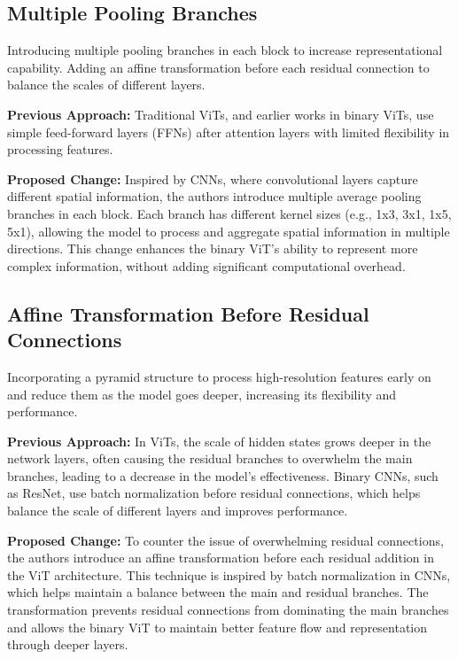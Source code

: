 \documentclass{report}
\begin{document}
	
	\subsection{Multiple Pooling Branches}
	Introducing multiple pooling branches in each block to increase representational capability.
	Adding an affine transformation before each residual connection to balance the scales of different layers.
	
	\textbf{Previous Approach:} Traditional ViTs, and earlier works in binary ViTs, use simple feed-forward layers (FFNs) after attention layers with limited flexibility in processing features.
	
	
	\textbf{Proposed Change:} Inspired by CNNs, where convolutional layers capture different spatial information, the authors introduce multiple average pooling branches in each block. Each branch has different kernel sizes (e.g., 1x3, 3x1, 1x5, 5x1), allowing the model to process and aggregate spatial information in multiple directions. This change enhances the binary ViT’s ability to represent more complex information, without adding significant computational overhead.
	
	
	
	\subsection{Affine Transformation Before Residual Connections}
	Incorporating a pyramid structure to process high-resolution features early on and reduce them as the model goes deeper, increasing its flexibility and performance.
	
	
	\textbf{Previous Approach:} In ViTs, the scale of hidden states grows deeper in the network layers, often causing the residual branches to overwhelm the main branches, leading to a decrease in the model’s effectiveness. Binary CNNs, such as ResNet, use batch normalization before residual connections, which helps balance the scale of different layers and improves performance.
	
	
	\textbf{Proposed Change:} To counter the issue of overwhelming residual connections, the authors introduce an affine transformation before each residual addition in the ViT architecture. This technique is inspired by batch normalization in CNNs, which helps maintain a balance between the main and residual branches. The transformation prevents residual connections from dominating the main branches and allows the binary ViT to maintain better feature flow and representation through deeper layers.
	
\end{document}
